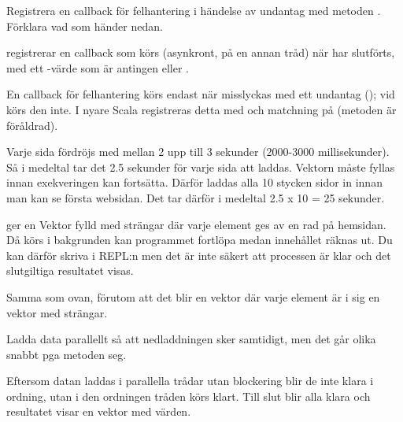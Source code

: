 \Subtask Registrera en callback för felhantering i händelse av undantag med metoden . Förklara vad som händer nedan.



\SOLUTION


\TaskSolved \what

\SubtaskSolved
{} registrerar en callback som körs (asynkront, på en annan tråd) när  har slutförts, med ett -värde som är antingen  eller .

\SubtaskSolved
En callback för felhantering körs endast när  misslyckas med ett undantag (); vid  körs den inte. I nyare Scala registreras detta med  och matchning på  (metoden  är föråldrad).

\SubtaskSolved  Varje sida fördröjs med mellan 2 upp till 3 sekunder (2000-3000 millisekunder). Så i medeltal tar det 2.5 sekunder för varje sida att laddas. Vektorn måste fyllas innan exekveringen kan fortsätta. Därför laddas alla 10 stycken sidor in innan man kan se första websidan. Det tar därför i medeltal 2.5 x 10 = 25 sekunder.

\SubtaskSolved  {} ger en Vektor fylld med strängar där varje element ges av en rad på hemsidan. Då  körs i bakgrunden kan programmet fortlöpa medan innehållet räknas ut. Du kan därför skriva  i REPL:n men det är inte säkert att processen är klar och det slutgiltiga resultatet visas.

\SubtaskSolved  Samma som ovan, förutom att det blir en vektor där varje element är i sig en vektor med strängar.

\SubtaskSolved  Ladda data parallellt så att nedladdningen sker samtidigt, men det går olika snabbt pga metoden seg.

\SubtaskSolved  Eftersom datan laddas i parallella trådar utan blockering blir de inte klara i ordning, utan i den ordningen tråden körs klart. Till slut blir alla klara och resultatet visar en vektor med  värden.

